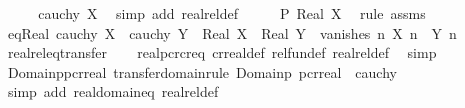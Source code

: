 \begin{isabellebody}
\ \ \isamarkupfalse%
\ \isamarkupfalse%
\ {\isachardoublequoteopen}cauchy\ X{\isachardoublequoteclose}\ \isamarkupfalse%
\ {\isacharparenleft}{\kern0pt}simp\ add{\isacharcolon}{\kern0pt}\ realrel{\isacharunderscore}{\kern0pt}def{\isacharparenright}{\kern0pt}\isanewline
\ \ \isamarkupfalse%
\ \isamarkupfalse%
\ {\isachardoublequoteopen}P\ {\isacharparenleft}{\kern0pt}Real\ X{\isacharparenright}{\kern0pt}{\isachardoublequoteclose}\ \isamarkupfalse%
\ {\isacharparenleft}{\kern0pt}rule\ assms{\isacharparenright}{\kern0pt}\isanewline
{}\isamarkupfalse%
%
\endisatagproof
{\isafoldproof}%
%
\isadelimproof
\isanewline
%
\endisadelimproof
\isanewline
{}\isamarkupfalse%
\ eq{\isacharunderscore}{\kern0pt}Real{\isacharcolon}{\kern0pt}\ {\isachardoublequoteopen}cauchy\ X\ {\isasymLongrightarrow}\ cauchy\ Y\ {\isasymLongrightarrow}\ Real\ X\ {\isacharequal}{\kern0pt}\ Real\ Y\ {\isasymlongleftrightarrow}\ vanishes\ {\isacharparenleft}{\kern0pt}{\isasymlambda}n{\isachardot}{\kern0pt}\ X\ n\ {\isacharminus}{\kern0pt}\ Y\ n{\isacharparenright}{\kern0pt}{\isachardoublequoteclose}\isanewline
%
\isadelimproof
\ \ %
\endisadelimproof
%
\isatagproof
{}\isamarkupfalse%
\ real{\isachardot}{\kern0pt}rel{\isacharunderscore}{\kern0pt}eq{\isacharunderscore}{\kern0pt}transfer\isanewline
\ \ \isamarkupfalse%
\ real{\isachardot}{\kern0pt}pcr{\isacharunderscore}{\kern0pt}cr{\isacharunderscore}{\kern0pt}eq\ cr{\isacharunderscore}{\kern0pt}real{\isacharunderscore}{\kern0pt}def\ rel{\isacharunderscore}{\kern0pt}fun{\isacharunderscore}{\kern0pt}def\ realrel{\isacharunderscore}{\kern0pt}def\ \isamarkupfalse%
\ simp%
\endisatagproof
{\isafoldproof}%
%
\isadelimproof
\isanewline
%
\endisadelimproof
\isanewline
{}\isamarkupfalse%
\ Domainp{\isacharunderscore}{\kern0pt}pcr{\isacharunderscore}{\kern0pt}real\ {\isacharbrackleft}{\kern0pt}transfer{\isacharunderscore}{\kern0pt}domain{\isacharunderscore}{\kern0pt}rule{\isacharbrackright}{\kern0pt}{\isacharcolon}{\kern0pt}\ {\isachardoublequoteopen}Domainp\ pcr{\isacharunderscore}{\kern0pt}real\ {\isacharequal}{\kern0pt}\ cauchy{\isachardoublequoteclose}\isanewline
%
\isadelimproof
\ \ %
\endisadelimproof
%
\isatagproof
{}\isamarkupfalse%
\ {\isacharparenleft}{\kern0pt}simp\ add{\isacharcolon}{\kern0pt}\ real{\isachardot}{\kern0pt}domain{\isacharunderscore}{\kern0pt}eq\ realrel{\isacharunderscore}{\kern0pt}def{\isacharparenright}{\kern0pt}%
\endisatagproof

\end{isabellebody}
